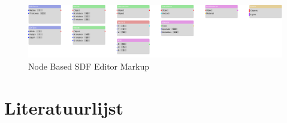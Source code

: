 \documentclass[12pt, a4paper]{article}
\begin{document}
\begin{figure}[H]
	\centering
	\includegraphics[width=\textwidth]{node_editor.png}
	\caption{Node Based SDF Editor Markup}
	\label{fig:node_editor}
\end{figure}
\clearpage
\section{Literatuurlijst}
\begingroup
\renewcommand{\section}[2]{}%


\endgroup
\clearpage
\end{document}
